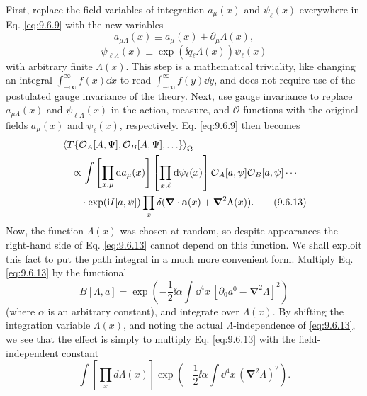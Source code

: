First, replace the field variables of integration $a_\mu(x)$ and $\psi_\ell(x)$
everywhere in Eq. \eqref{eq:9.6.9} with the new variables
\begin{equation}
a_{\mu\Lambda}(x)\equiv a_\mu(x)+\partial_\mu\Lambda(x),
\tag{9.6.11}\label{eq:9.6.11}
\end{equation}
\begin{equation}
\psi_{\ell\Lambda}(x)\equiv
 \exp(\ii q_\ell\Lambda(x))\psi_\ell(x)
\tag{9.6.12}\label{eq:9.6.12}
\end{equation}
with arbitrary finite $\Lambda(x)$. This step is a mathematical triviality,
like changing an integral $\int_{-\infty}^{\infty}f(x)\dd x$ to read
$\int_{-\infty}^{\infty}f(y)\dd y$, and does not require use of the postulated
gauge invariance of the theory. Next, use gauge invariance to replace
$a_{\mu\Lambda}(x)$ and $\psi_{\ell\Lambda}(x)$ in the action, measure, and
$\mathcal O$-functions with the original fields $a_\mu(x)$ and $\psi_\ell(x)$,
respectively. Eq. \eqref{eq:9.6.9} then becomes
\begin{align}
&\left\langle T\{\mathcal O_A[A,\Psi],\mathcal O_B[A,\Psi],\ldots\}
 \right\rangle_{\Omega}
\notag\\
&\quad\propto\int\left[\prod_{x,\mu}\mathop{}\!\mathrm{d} a_\mu(x)\right]
 \left[\prod_{x,\ell}\mathop{}\!\mathrm{d}\psi_\ell(x)\right]
 \mathcal O_A[a,\psi]\mathcal O_B[a,\psi]\cdots
\notag\\
&\qquad\cdot\exp(\mathrm{i} I[a,\psi])
 \prod_x\delta(\boldsymbol\nabla\cdot\mathbf a(x)
 +\boldsymbol\nabla^2\Lambda(x)).
\tag{9.6.13}\label{eq:9.6.13}
\end{align}
Now, the function $\Lambda(x)$ was chosen at random, so despite appearances the
right-hand side of Eq. \eqref{eq:9.6.13} cannot depend on this function. We shall exploit
this fact to put the path integral in a much more convenient form. Multiply
Eq. \eqref{eq:9.6.13} by the functional
\begin{equation}
B[\Lambda,a]=\exp\left(-\frac12\ii\alpha\int \dd^4x\,
 [\partial_0a^0-\boldsymbol\nabla^2\Lambda]^2\right)
\tag{9.6.14}\label{eq:9.6.14}
\end{equation}
(where $\alpha$ is an arbitrary constant), and integrate over $\Lambda(x)$.
By shifting the integration variable $\Lambda(x)$, and noting the actual
$\Lambda$-independence of \eqref{eq:9.6.13}, we see that the effect is simply to
multiply Eq. \eqref{eq:9.6.13} with the field-independent constant
\begin{equation}
\int\left[\prod_xd\Lambda(x)\right]
 \exp\left(-\frac12\ii\alpha\int \dd^4x\,
 (\boldsymbol\nabla^2\Lambda)^2\right).
\tag{9.6.15}\label{eq:9.6.15}
\end{equation}
